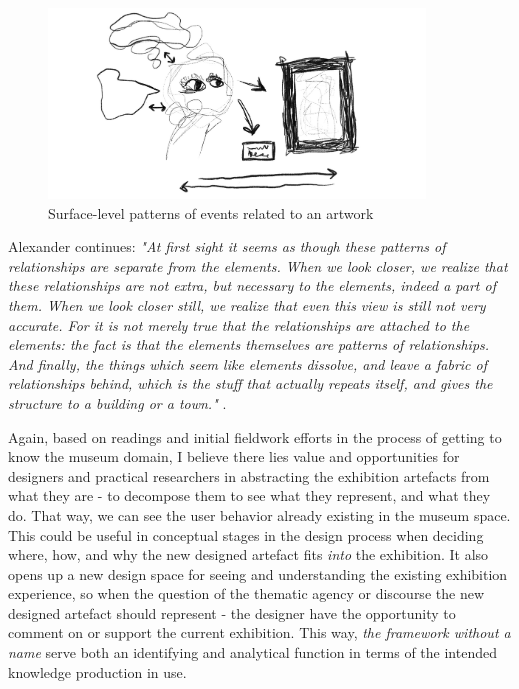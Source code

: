 \begin{figure}[H]
\centering 
\includegraphics[width=10cm]{pictures/Theory/artwork_pattern.jpeg}
\caption{Surface-level patterns of events related to an artwork}
\end{figure}

Alexander continues: \emph{"At first sight it seems as though these patterns of relationships are separate from the elements. When we look closer, we realize that these relationships are not extra, but necessary to the elements, indeed a part of them. When we look closer still, we realize that even this view is still not very accurate. For it is not merely true that the relationships are attached to the elements: the fact is that the elements themselves are patterns of relationships. And finally, the things which seem like elements dissolve, and leave a fabric of relationships behind, which is the stuff that actually repeats itself, and gives the structure to a building or a town."} \autocite[p. 85-89]{Alexander_book}.

Again, based on readings and initial fieldwork efforts in the process of getting to know the museum domain, I believe there lies value and opportunities for designers and practical researchers in abstracting the exhibition artefacts from what they are - to decompose them to see what they represent, and what they do. That way, we can see the user behavior already existing in the museum space. This could be useful in conceptual stages in the design process when deciding where, how, and why the new designed artefact fits \emph{into} the exhibition. It also opens up a new design space for seeing and understanding the existing exhibition experience, so when the question of the thematic agency or discourse the new designed artefact should represent - the designer have the opportunity to comment on or support the current exhibition. This way, \emph{the framework without a name} serve both an identifying and analytical function in terms of the intended knowledge production in use.


